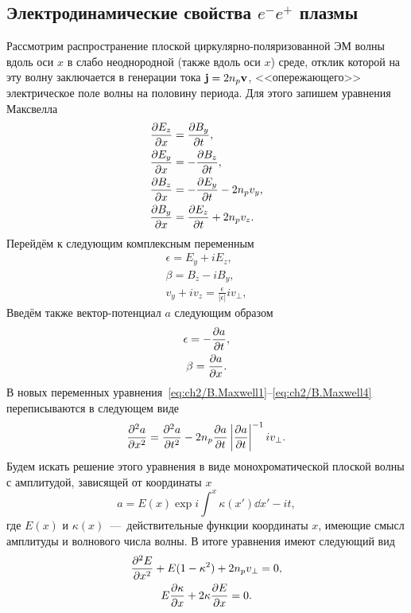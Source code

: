 \subsection{Электродинамические свойства $e^-e^+$ плазмы}
\label{app.Electrodynamics}

Рассмотрим распространение плоской циркулярно-поляризованной ЭМ волны вдоль оси $x$ в слабо неоднородной (также вдоль оси $x$) среде, отклик которой на эту волну заключается в генерации тока $\vb{j}=2n_p\vb{v}$, <<опережающего>> электрическое поле волны на половину периода.
Для этого запишем уравнения Максвелла
\begin{align}
    \label{eq:ch2/B.Maxwell1}
    \pdv{ E_z}{ x} &= \pdv{ B_y}{ t}, \\
    \label{eq:ch2/B.Maxwell2}
    \pdv{ E_y}{ x} &= -\pdv{ B_z}{ t}, \\
    \label{eq:ch2/B.Maxwell3}
    \pdv{ B_z}{ x} &= -\pdv{ E_y}{ t} - 2 n_p v_y, \\
    \label{eq:ch2/B.Maxwell4}
    \pdv{ B_y}{ x} &= \pdv{ E_z}{ t} + 2 n_p v_z.
\end{align}
Перейдём к следующим комплексным переменным
\begin{gather}
    \epsilon=E_y+iE_z, 
    \label{eps} \\
    \beta=B_z-iB_y, \\
    v_y+iv_z=\frac{\epsilon}{|\epsilon|}iv_{\perp} ,
\end{gather}
Введём также вектор-потенциал $a$ следующим образом
\begin{gather}
    \epsilon=-\pdv{ a}{ t}, \\
    \beta=\pdv{ a}{ x}.
\end{gather}
В новых переменных уравнения~\eqref{eq:ch2/B.Maxwell1}--\eqref{eq:ch2/B.Maxwell4} переписываются в следующем виде
\begin{equation}
    \pdv[2]{ a}{ x}=\pdv[2]{ a}{ t}-2 n_p \pdv{ a}{ t}\left| \pdv{ a}{ t} \right|^{-1} iv_\perp.
\end{equation}
Будем искать решение этого уравнения в виде монохроматической плоской волны с амплитудой, зависящей от координаты $x$
\begin{equation}
    a=E(x)\exp{i\int^{x}\kappa(x')\dd x'-it},
    \label{a}
\end{equation}
где $E(x)$ и $\kappa(x)$~---~действительные функции координаты $x$, имеющие смысл амплитуды и волнового числа волны.
В итоге уравнения имеют следующий вид
\begin{gather}
    \label{eq:ch2/B.Cushion1}
    \pdv[2]{ E}{ x}+E(1-\kappa^2)+2 n_p v_{\perp} =0, \\
    \label{eq:ch2/B.Cushion2}
    E \pdv{ \kappa}{ x} + 2\kappa \pdv{ E}{ x} = 0.
\end{gather}
